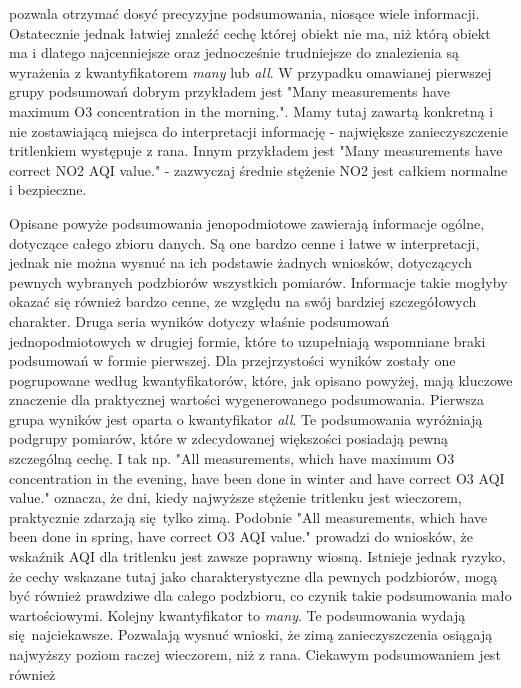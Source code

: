 \documentclass{classrep}
\begin{document}
{        pozwala otrzymać dosyć precyzyjne podsumowania, niosące wiele informacji. Ostatecznie jednak
        łatwiej znaleźć cechę której obiekt nie ma, niż którą obiekt ma i dlatego najcenniejsze oraz
        jednocześnie trudniejsze do znalezienia są wyrażenia z kwantyfikatorem \emph{many} lub
        \emph{all}. W przypadku omawianej pierwszej grupy podsumowań dobrym przykładem jest "Many
        measurements have maximum O3 concentration in the morning.". Mamy tutaj zawartą konkretną i
        nie zostawiającą miejsca do interpretacji informację - największe zanieczyszczenie
        tritlenkiem występuje z rana. Innym przykładem jest "Many measurements have correct NO2 AQI
        value." - zazwyczaj średnie stężenie NO2 jest całkiem normalne i bezpieczne.

        Opisane powyże podsumowania jenopodmiotowe zawierają informacje ogólne, dotyczące całego
        zbioru danych. Są one bardzo cenne i łatwe w interpretacji, jednak nie można wysnuć na ich
        podstawie żadnych wniosków, dotyczących pewnych wybranych podzbiorów wszystkich pomiarów.
        Informacje takie mogłyby okazać się również bardzo cenne, ze względu na swój bardziej
        szczegółowych charakter. Druga seria wyników dotyczy właśnie podsumowań jednopodmiotowych w
        drugiej formie, które to uzupełniają wspomniane braki podsumowań w formie pierwszej. Dla
        przejrzystości wyników zostały one pogrupowane według kwantyfikatorów, które, jak opisano
        powyżej, mają kluczowe znaczenie dla praktycznej wartości wygenerowanego podsumowania.
        Pierwsza grupa wyników jest oparta o kwantyfikator \emph{all}. Te podsumowania wyróżniają
        podgrupy pomiarów, które w zdecydowanej większości posiadają pewną szczególną cechę. I tak
        np. "All measurements, which have maximum O3 concentration in the evening, have been done in
        winter and have correct O3 AQI value." oznacza, że dni, kiedy najwyższe stężenie tritlenku
        jest wieczorem, praktycznie zdarzają się tylko zimą. Podobnie "All measurements, which have
        been done in spring, have correct O3 AQI value." prowadzi do wniosków, że wskaźnik AQI dla
        tritlenku jest zawsze poprawny wiosną. Istnieje jednak ryzyko, że cechy wskazane tutaj jako
        charakterystyczne dla pewnych podzbiorów, mogą być również prawdziwe dla całego podzbioru,
        co czynik takie podsumowania mało wartościowymi. Kolejny kwantyfikator to \emph{many}. Te
        podsumowania wydają się najciekawsze. Pozwalają wysnuć wnioski, że zimą zanieczyszczenia
        osiągają najwyższy poziom raczej wieczorem, niż z rana.  Ciekawym podsumowaniem jest również
}
\end{document}
